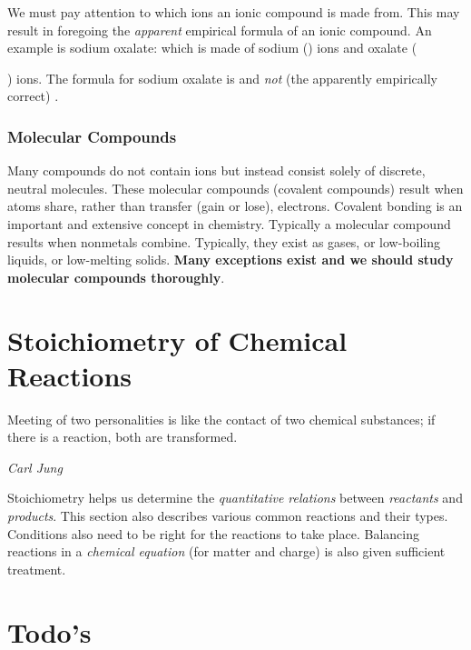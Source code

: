 \documentclass{article}
\begin{document}
We must pay attention to which ions an ionic compound is made from. This may result in foregoing the \emph{apparent} empirical formula of an ionic compound. An example is sodium oxalate:  which is made of sodium () ions and oxalate ({) ions. The formula for sodium oxalate is  and \emph{not} (the apparently empirically correct) .
\subsubsection{Molecular Compounds}
Many compounds do not contain ions but instead consist solely of discrete, neutral molecules. These molecular compounds (covalent compounds) result when atoms share, rather than transfer (gain or lose), electrons. Covalent bonding is an important and extensive concept in chemistry. Typically a molecular compound results when nonmetals combine. Typically, they exist as gases, or low-boiling liquids, or low-melting solids. \textbf{Many exceptions exist and we should study molecular compounds thoroughly}.

\section{Stoichiometry of Chemical Reactions}
\renewcommand{\epigraphsize}{\small}
\setlength{\epigraphwidth}{0.8\textwidth}
\epigraph
{
    Meeting of two personalities is like the contact of two chemical substances; if there is a reaction, both are transformed.
}
{
    \textit{Carl Jung}
}

\label{sec: stoichiometry}
Stoichiometry helps us determine the \textit{quantitative relations} between \textit{reactants} and \textit{products}. This section also describes various common reactions and their types. Conditions also need to be right for the reactions to take place. Balancing reactions in a \textit{chemical equation} (for matter and charge) is also given sufficient treatment.

\section{Todo's} 
}
\end{document}
